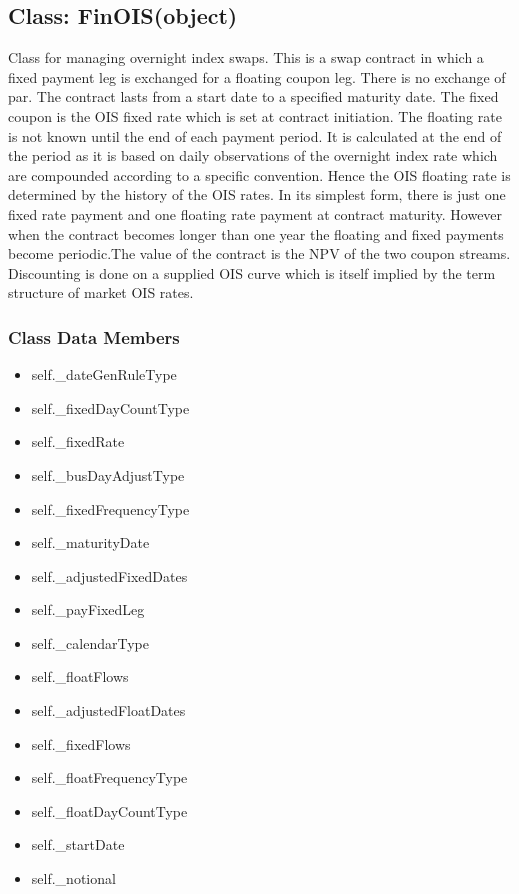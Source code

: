 \documentclass[twoside,11pt]{book}
\begin{document}
\subsection{Class: FinOIS(object)}
Class for managing overnight index swaps. This is a swap contract in which a fixed payment leg is exchanged for a floating coupon leg. There is no exchange of par. The contract lasts from a start date to a specified maturity date. The fixed coupon is the OIS fixed rate which is set at contract initiation. The floating rate is not known until the end of each payment period. It is calculated at the end of the period as it is based on daily observations of the overnight index rate which are compounded according to a specific convention. Hence the OIS floating rate is determined by the history of the OIS rates. In its simplest form, there is just one fixed rate payment and one floating rate payment at contract maturity. However when the contract becomes longer than one year the floating and fixed payments become periodic.The value of the contract is the NPV of the two coupon streams. Discounting is done on a supplied OIS curve which is itself implied by the term structure of market OIS rates. 

\subsubsection{Class Data Members}
\begin{itemize}
\item{self.\_dateGenRuleType}
\item{self.\_fixedDayCountType}
\item{self.\_fixedRate}
\item{self.\_busDayAdjustType}
\item{self.\_fixedFrequencyType}
\item{self.\_maturityDate}
\item{self.\_adjustedFixedDates}
\item{self.\_payFixedLeg}
\item{self.\_calendarType}
\item{self.\_floatFlows}
\item{self.\_adjustedFloatDates}
\item{self.\_fixedFlows}
\item{self.\_floatFrequencyType}
\item{self.\_floatDayCountType}
\item{self.\_startDate}
\item{self.\_notional}
\end{itemize}
\end{document}
